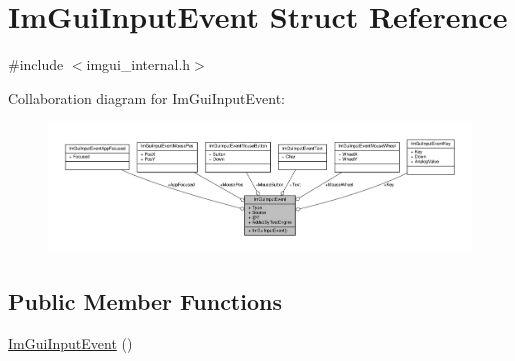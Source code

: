 \hypertarget{structImGuiInputEvent}{}\section{Im\+Gui\+Input\+Event Struct Reference}
\label{structImGuiInputEvent}


{\ttfamily \#include $<$imgui\+\_\+internal.\+h$>$}



Collaboration diagram for Im\+Gui\+Input\+Event\+:
\nopagebreak
\begin{figure}[H]
\begin{center}
\leavevmode
\includegraphics[width=350pt]{structImGuiInputEvent__coll__graph}
\end{center}
\end{figure}
\subsection*{Public Member Functions}
\begin{DoxyCompactItemize}
\item 
\hyperlink{structImGuiInputEvent_a0245c48f5f48b23defb78940c3a4a5ba}{Im\+Gui\+Input\+Event} ()
\end{DoxyCompactItemize}
